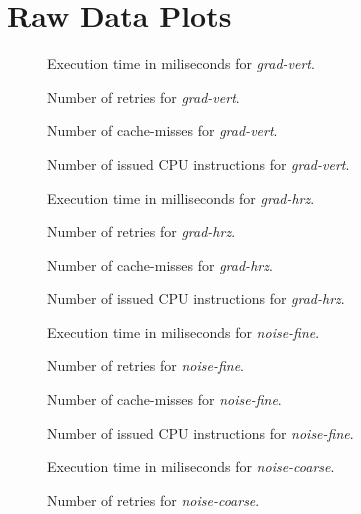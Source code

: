 \chapter{Raw Data Plots}
\label{chpt:omitted-data}

\begin{figure}[h]
  \centering
  \caption{Execution time in miliseconds for \emph{grad-vert}.}
  \caption{Number of retries for \emph{grad-vert}.}
\end{figure}

\begin{figure}
  \centering
  \caption{Number of cache-misses for \emph{grad-vert}.}
  \caption{Number of issued CPU instructions for \emph{grad-vert}.}
  \caption{Execution time in milliseconds for \emph{grad-hrz}.}
\end{figure}

\begin{figure}
  \centering
  \caption{Number of retries for \emph{grad-hrz}.}
  \caption{Number of cache-misses for \emph{grad-hrz}.}
  \caption{Number of issued CPU instructions for \emph{grad-hrz}.}
\end{figure}

\begin{figure}
  \centering
  \caption{Execution time in miliseconds for \emph{noise-fine}.}
  \caption{Number of retries for \emph{noise-fine}.}
  \caption{Number of cache-misses for \emph{noise-fine}.}
\end{figure}

\begin{figure}
  \centering
  \caption{Number of issued CPU instructions for \emph{noise-fine}.}
  \caption{Execution time in miliseconds for \emph{noise-coarse}.}
  \caption{Number of retries for \emph{noise-coarse}.}
\end{figure}

